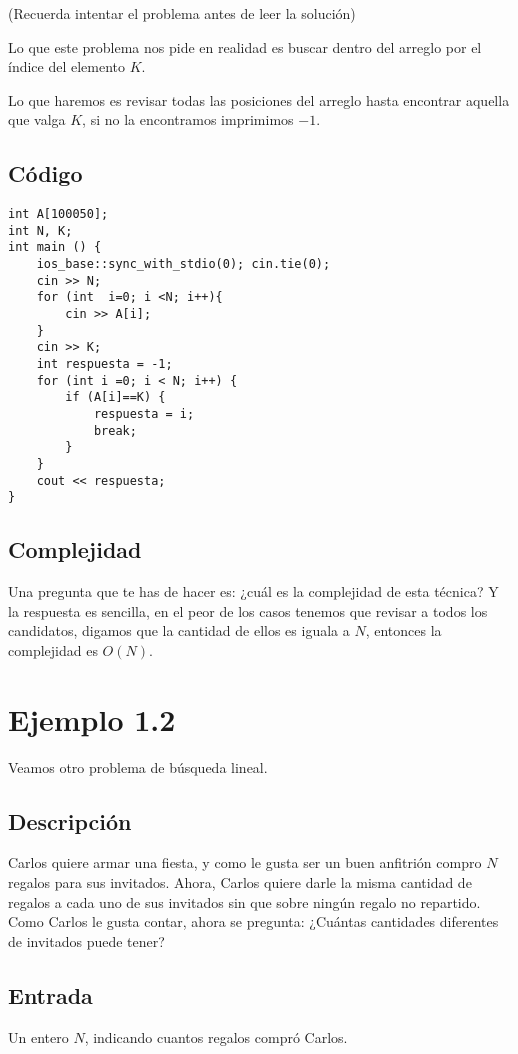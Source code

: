 (Recuerda intentar el problema antes de leer la solución)

Lo que este problema nos pide en realidad es buscar dentro del arreglo por el índice del elemento \(K\).

Lo que haremos es revisar todas las posiciones del arreglo hasta encontrar aquella que valga \(K\), si no la encontramos imprimimos \(-1\).


\subsection*{Código}
\begin{lstlisting}
int A[100050];
int N, K;
int main () {	
	ios_base::sync_with_stdio(0); cin.tie(0);
	cin >> N;
	for (int  i=0; i <N; i++){ 
		cin >> A[i];
	}
	cin >> K;
	int respuesta = -1;
	for (int i =0; i < N; i++) {
		if (A[i]==K) {
			respuesta = i;
			break;
		}
	}
	cout << respuesta;
}
\end{lstlisting}


\subsection*{Complejidad}

Una pregunta que te has de hacer es: ¿cuál es la complejidad de esta técnica? Y la respuesta es sencilla, en el peor de los casos tenemos que revisar a todos los candidatos, digamos que la cantidad de ellos es iguala a \(N\), entonces la complejidad es \(O(N)\).

\section*{Ejemplo 1.2}
Veamos otro problema de búsqueda lineal. 

\subsection*{Descripción}

Carlos quiere armar una fiesta, y como le gusta ser un buen anfitrión compro \(N\) regalos para sus invitados.
Ahora, Carlos quiere darle la misma cantidad de regalos a cada uno de sus invitados sin que sobre ningún regalo no repartido. Como Carlos le gusta contar, ahora se pregunta: ¿Cuántas cantidades diferentes de invitados puede tener?
\subsection*{Entrada}
Un entero \(N\), indicando cuantos regalos compró Carlos.
